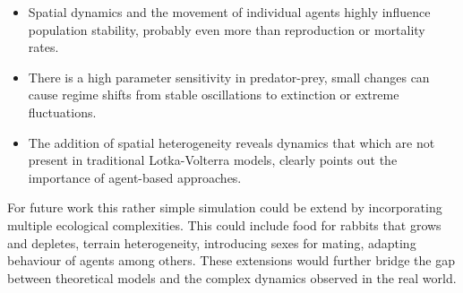 \begin{itemize}
	\item Spatial dynamics and the movement of individual agents highly influence population stability, probably even more than reproduction or mortality rates.
	\item There is a high parameter sensitivity in predator-prey, small changes can cause regime shifts from stable oscillations to extinction or extreme fluctuations.
	\item The addition of spatial heterogeneity reveals dynamics that which are not present in traditional Lotka-Volterra models, clearly points out  the importance of agent-based approaches.
\end{itemize}
For future work this rather simple simulation could be extend by incorporating multiple ecological complexities. This could include food for rabbits that grows and depletes, terrain heterogeneity, introducing sexes for mating, adapting behaviour of agents among others. These extensions would further bridge the gap between theoretical models and the complex dynamics observed in the real world.
